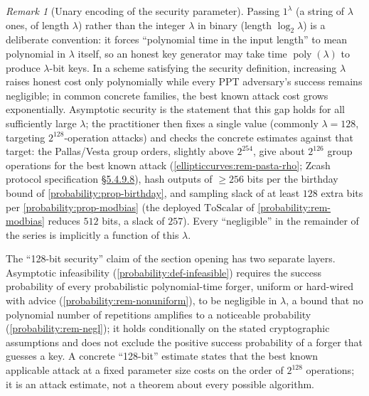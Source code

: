 \documentclass[11pt,a4paper]{article}
\theoremstyle{definition}
\theoremstyle{remark}
\newtheorem{remark}[theorem]{Remark}
\DeclareMathOperator{\poly}{poly}
\begin{document}
\begin{remark}[Unary encoding of the security parameter]
\label{probability:rem-unary}
Passing \(1^\lambda\) (a string of \(\lambda\) ones, of length
\(\lambda\)) rather than the integer \(\lambda\) in binary (length
\(\log_2 \lambda\)) is a deliberate convention: it forces
``polynomial time in the input length'' to mean polynomial in
\(\lambda\) itself, so an honest key generator may take time
\(\poly(\lambda)\) to produce \(\lambda\)-bit keys. In a scheme satisfying
the security definition, increasing \(\lambda\) raises honest cost only
polynomially while every PPT adversary's success remains negligible; in
common concrete families, the best known attack cost grows exponentially.
Asymptotic security is the statement that this gap holds for all
sufficiently large \(\lambda\); the practitioner then fixes a single
value (commonly \(\lambda = 128\), targeting
\(2^{128}\)-operation attacks) and checks the concrete estimates against
that target: the Pallas/Vesta group orders, slightly above
\(2^{254}\), give about \(2^{126}\) group operations for the best known
attack (\cref{ellipticcurves:rem-pasta-rho}; Zcash protocol specification
\href{https://zips.z.cash/protocol/protocol.pdf\#concretegrouphashpallasandvesta}{\S5.4.9.8}),
hash outputs of \({\ge}256\) bits per the birthday bound of
\cref{probability:prop-birthday}, and sampling slack of at least
\(128\) extra bits per \cref{probability:prop-modbias} (the deployed
\(\mathrm{ToScalar}\) of \cref{probability:rem-modbias} reduces
\(512\) bits, a slack of \(257\)). Every ``negligible'' in the
remainder of the series is implicitly a function of this \(\lambda\).
\end{remark}

The ``128-bit security'' claim of the section opening has two separate
layers. Asymptotic infeasibility (\cref{probability:def-infeasible})
requires the success probability of every probabilistic polynomial-time
forger, uniform or hard-wired with advice
(\cref{probability:rem-nonuniform}), to be negligible in \(\lambda\),
a bound that no polynomial number of repetitions amplifies to a
noticeable probability (\cref{probability:rem-negl}); it holds
conditionally on the stated cryptographic assumptions and does not
exclude the positive success probability of a forger that guesses a
key. A concrete ``128-bit'' estimate states that the best known
applicable attack at a fixed parameter size costs on the order of
\(2^{128}\) operations; it is an attack estimate, not a theorem about
every possible algorithm.
\end{document}
